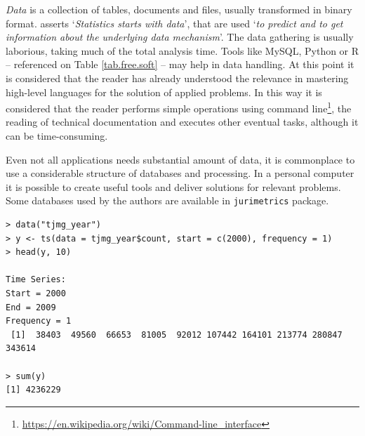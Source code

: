 \documentclass[a4paper]{exam}
\theoremstyle{plain}
\begin{document}
\textit{Data} is a collection of tables, documents and files, usually transformed in binary format. \cite{breiman2001statistical} asserts `\textit{Statistics starts with data}', that are used `\textit{to predict and to get information about the underlying data mechanism}'. The data gathering is usually laborious, taking much of the total analysis time. Tools like MySQL, Python or R -- referenced on Table \ref{tab.free.soft} -- may help in data handling.  At this point it is considered that the reader has already understood the relevance in mastering high-level languages for the solution of applied problems. In this way it is considered that the reader performs simple operations using command line\footnote{ \url{https://en.wikipedia.org/wiki/Command-line_interface}}, the reading of technical documentation and executes other eventual tasks, although it can be time-consuming. 

Even not all applications needs substantial amount of data, it is commonplace to use a considerable structure of databases and processing. In a personal computer it is possible to create useful tools and deliver solutions for relevant problems. Some databases used by the authors are available in \texttt{jurimetrics} package.

\begin{tcolorbox}[colback=black, coltext=white]
\begingroup
\fontsize{9pt}{9pt}\selectfont
\begin{verbatim}
> data("tjmg_year")
> y <- ts(data = tjmg_year$count, start = c(2000), frequency = 1)
> head(y, 10)

Time Series:
Start = 2000
End = 2009
Frequency = 1
 [1]  38403  49560  66653  81005  92012 107442 164101 213774 280847 343614

> sum(y)
[1] 4236229
\end{verbatim}
\endgroup
\end{tcolorbox}
\end{document}
